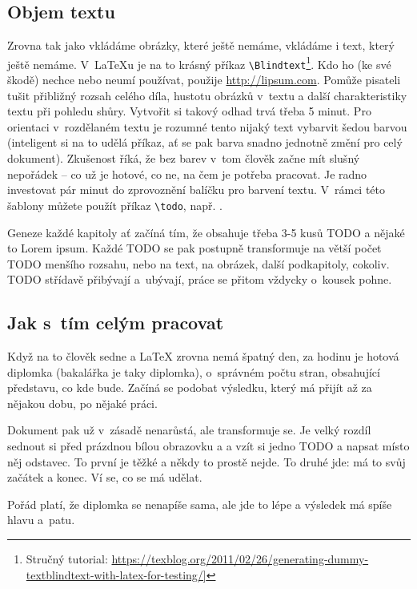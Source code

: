 \subsection*{Objem textu}
Zrovna tak jako vkládáme obrázky, které ještě nemáme, vkládáme i text, který ještě nemáme. V~\LaTeX{}u je na to krásný příkaz \texttt{\textbackslash Blindtext}\footnote{Stručný tutorial: \url{https://texblog.org/2011/02/26/generating-dummy-textblindtext-with-latex-for-testing/]}}. Kdo ho (ke své škodě) nechce nebo neumí používat, použije \url{http://lipsum.com}. Pomůže pisateli tušit přibližný rozsah celého díla, hustotu obrázků v~textu a další charakteristiky textu při pohledu shůry. Vytvořit si takový odhad trvá třeba 5 minut. Pro orientaci v~rozdělaném textu je rozumné tento nijaký text vybarvit šedou barvou (inteligent si na to udělá příkaz, ať se pak barva snadno jednotně změní pro celý dokument). Zkušenost říká, že bez barev v~tom člověk začne mít slušný nepořádek -- co už je hotové, co ne, na čem je potřeba pracovat. Je radno investovat pár minut do zprovoznění balíčku pro barvení textu. V~rámci této šablony můžete použít příkaz \verb|\todo|, např. . 

Geneze každé kapitoly ať začíná tím, že obsahuje třeba 3-5 kusů TODO a nějaké to Lorem ipsum. Každé TODO se pak postupně transformuje na větší počet TODO menšího rozsahu, nebo na text, na obrázek, další podkapitoly, cokoliv. TODO střídavě přibývají a~ubývají, práce se přitom vždycky o~kousek pohne.

\subsection*{Jak s~tím celým pracovat}
Když na to člověk sedne a \LaTeX{} zrovna nemá špatný den, za hodinu je hotová diplomka (bakalářka je taky diplomka), o~správném počtu stran, obsahující představu, co kde bude. Začíná se podobat výsledku, který má přijít až za nějakou dobu, po nějaké práci.

Dokument pak už v~zásadě nenarůstá, ale transformuje se. Je velký rozdíl sednout si před prázdnou bílou obrazovku a  a vzít si jedno TODO a napsat místo něj odstavec. To první je těžké a někdy to prostě nejde. To druhé jde: má to svůj začátek a konec. Ví se, co se má udělat.

Pořád platí, že diplomka se nenapíše sama, ale jde to lépe a výsledek má spíše hlavu a~patu.

